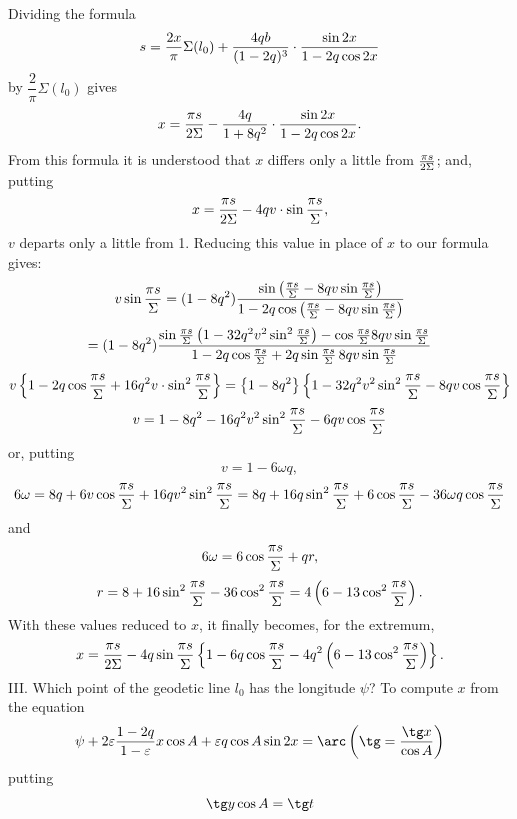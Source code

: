 \begingroup\small
Dividing the formula
\[
 s={2x\over\pi}\Sigma(l_0)+{4qb\over(1-2q)^3}\cdot{\sin2x\over1-2q\cos2x}
\]
by $\dfrac{2}{\pi}\Sigma(l_0)$ gives
\[
 x={\pi s\over2\Sigma}-{4q\over1+8q^2}\cdot{\sin2x\over1-2q\cos2x}.
\]
From this formula it is understood that $x$ differs only a little from ${\pi s\over2\Sigma}$; and, putting
\[
 x={\pi s\over2\Sigma}-4qv\cdot\sin{\pi s\over\Sigma},
\]
$v$ departs only a little from 1. Reducing this value in place of $x$ to our formula gives:
\[
 v\sin{\pi s\over\Sigma}
=(1-8q^2){\sin\left({\pi s\over\Sigma}-8qv\sin{\pi s\over\Sigma}\right)
\over
1-2q\cos\left({\pi s\over\Sigma}-8qv\sin{\pi s\over\Sigma}\right)}
\]
\[
=(1-8q^2){\sin{\pi s\over\Sigma}\left(1-32q^2v^2\sin^2{\pi s\over\Sigma}\right)-\cos{\pi s\over\Sigma}8qv\sin{\pi s\over\Sigma}
\over
1-2q\cos{\pi s\over\Sigma}+2q\sin{\pi s\over\Sigma}\,8qv\sin{\pi s\over\Sigma}}
\]
\[
 v\left\{1-2q\cos{\pi s\over\Sigma}+16q^2v\cdot\sin^2{\pi s\over\Sigma}\right\}
=\left\{1-8q^2\right\}\left\{1-32q^2v^2\sin^2{\pi s\over\Sigma}-8qv\cos{\pi s\over\Sigma}\right\}
\]
\[
 v=1-8q^2-16q^2v^2\sin^2{\pi s\over\Sigma}-6qv\cos{\pi s\over\Sigma}
\]
or, putting
\[
 v=1-6\omega q,
\]
\[
 6\omega=8q+6v\cos{\pi s\over\Sigma}+16qv^2\sin^2{\pi s\over\Sigma}
=8q+16q\sin^2{\pi s\over\Sigma}+6\cos{\pi s\over\Sigma}-36\omega q\cos{\pi s\over\Sigma}
\]
and
\[
 6\omega=6\cos{\pi s\over\Sigma}+q r,
\]
\[
 r=8+16\sin^2{\pi s\over\Sigma}-36\cos^2{\pi s\over\Sigma}=4\left(6-13\cos^2{\pi s\over\Sigma}\right).
\]
With these values reduced to $x$, it finally becomes, for the extremum,
\[
 x={\pi s\over2\Sigma}-4q\sin{\pi s\over\Sigma}\left\{1-6q\cos{\pi s\over\Sigma}-4q^2\left(6-13\cos^2{\pi s\over\Sigma}\right)\right\}.
\]
III. Which point of the geodetic line $l_0$ has the longitude $\psi$? To compute $x$ from the equation
\[
 \psi+2\varepsilon{1-2q\over1-\varepsilon}x\cos A+\varepsilon q\cos A\sin2x
 =\arc\left(\tg={\tg x\over\cos A}\right)
\]
putting
\[
 \tg y\cos A=\tg t
\]
\endgroup
